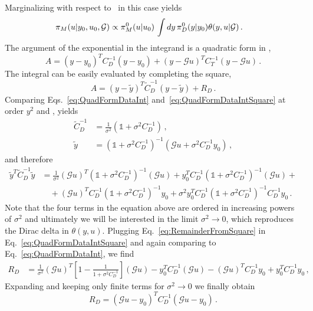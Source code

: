 Marginalizing with respect to \obs\ in this case yields 
\begin{align}
  \label{eq:MarginGaussData}
  \pi_M(u|y_0,u_0,\mathcal{G}) 
  &\propto \pi_{M}^0(u|u_0) \, 
  \int dy\, \pi_{D}^0(y|y_0) 
    \theta(y,u|\mathcal{G}) \, .
\end{align}
The argument of the exponential in the integrand is a quadratic form in \obs, 
\begin{equation}
    \label{eq:QuadFormDataInt}
    A = \left(y-y_0\right)^T C_D^{-1} \left(y-y_0\right) +
    \left(y-\mathcal{G}u\right)^T C_T^{-1} \left(y-\mathcal{G}u\right)\, .
\end{equation}
The integral can be easily evaluated by completing the square, 
\begin{equation}
    \label{eq:QuadFormDataIntSquare}
    A = \left(y-\tilde{y}\right)^T 
    \tilde{C}_D^{-1}
    \left(y-\tilde{y}\right) + R_D\, .
\end{equation}
Comparing Eqs.~\ref{eq:QuadFormDataInt} and~\ref{eq:QuadFormDataIntSquare} at order $y^2$ and \obs, yields
\begin{align}
    \tilde{C}_D^{-1} &= \frac{1}{\sigma^2}
    \left(\mathds{1} + \sigma^2 C_D^{-1}\right)\, , \\
    \tilde{y} &= \left(\mathds{1} + \sigma^2 C_D^{-1}\right)^{-1} 
    \left(
        \mathcal{G}u + \sigma^2 C_D^{-1} y_0
    \right)\, ,
\end{align}
and therefore
\begin{align}
    \tilde{y}^T \tilde{C}_D^{-1} \tilde{y}
    &= \frac{1}{\sigma^2} \left(\mathcal{G}u\right)^T
    \left(\mathds{1}+\sigma^2 C_D^{-1}\right)^{-1} \left(\mathcal{G}u\right) +
    y_0^T C_D^{-1} \left(\mathds{1}+\sigma^2 C_D^{-1}\right)^{-1} 
    \left(\mathcal{G}u\right) + \nonumber \\
    \label{eq:RemainderFromSquare}
    & \quad + \left(\mathcal{G}u\right)^T C_D^{-1} 
    \left(\mathds{1}+\sigma^2 C_D^{-1}\right)^{-1} y_0 + 
    \sigma^2 y_0^T C_D^{-1} \left(\mathds{1}+\sigma^2 C_D^{-1}\right)^{-1} 
    C_D^{-1} y_0\, .
\end{align}
Note that the four terms in the equation above are ordered in increasing powers
of $\sigma^2$ and ultimately we will be interested in the limit $\sigma^2\to 0$,
which reproduces the Dirac delta in $\theta(y,u)$. Plugging
Eq.~\ref{eq:RemainderFromSquare} in Eq.~\ref{eq:QuadFormDataIntSquare} and again
comparing to Eq.~\ref{eq:QuadFormDataInt}, we find
\begin{align}
    \label{eq:RDBeforeLimit}   
    R_D 
    &= \frac{1}{\sigma^2} \left(\mathcal{G}u\right)^T 
    \left[
        1 - \frac{1}{1+\sigma^2 C_D^{-1}} 
    \right]
    \left(\mathcal{G}u\right) - y_0^T C_D^{-1} \left(\mathcal{G}u\right)
    - \left(\mathcal{G}u\right)^T C_D^{-1} y_0 + y_0^T C_D^{-1} y_0\, ,
\end{align}
Expanding and keeping only finite terms for $\sigma^2 \to 0$ we finally obtain
\begin{equation}
    \label{eq:RDAfterLimit}
    R_D = \left(\mathcal{G}u - y_0\right)^T C_D^{-1}
    \left(\mathcal{G}u - y_0\right)\, .
\end{equation}



